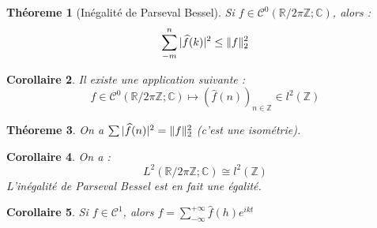 \documentclass[a4paper, oneside]{report}
\theoremstyle{break}
\newtheorem{thm}{Théoreme}[section] %
\newtheorem{cor}[thm]{Corollaire}
\newcommand{\R}{\mathbb{R}}
\newcommand{\C}{\mathbb{C}}
\newcommand{\Z}{\mathbb{Z}}
\DeclarePairedDelimiter\norm{\lVert}{\rVert}%
\begin{document}
\begin{thm}[Inégalité de Parseval Bessel]
Si $f \in \mathcal{C}^0(\R/2\pi\Z; \C)$, alors :
$$\sum_{-m}^{n}|\widehat{f}(k)|^2\leq \norm{f}_2^2$$
\end{thm}

\begin{cor}
Il existe une application suivante :
$$f \in \mathcal{C}^0(\R/2\pi\Z; \C) \mapsto (\widehat{f}(n))_{n\in \Z}\in l^2(\Z)$$
\end{cor}

\begin{thm}
On a $\sum |\widehat{f}(n)|^2=\norm{f}_2^2$ (c'est une isométrie).
\end{thm}

\begin{cor}
On a :
$$L^2(\R/2\pi\Z; \C) \cong l^2(\Z)$$
L'inégalité de Parseval Bessel est en fait une égalité.
\end{cor}

\begin{cor}
Si $f\in \mathcal{C}^1$, alors $f = \sum_{-\infty}^{+\infty}\widehat{f}(h)e^{ikt}$
\end{cor}
\end{document}

